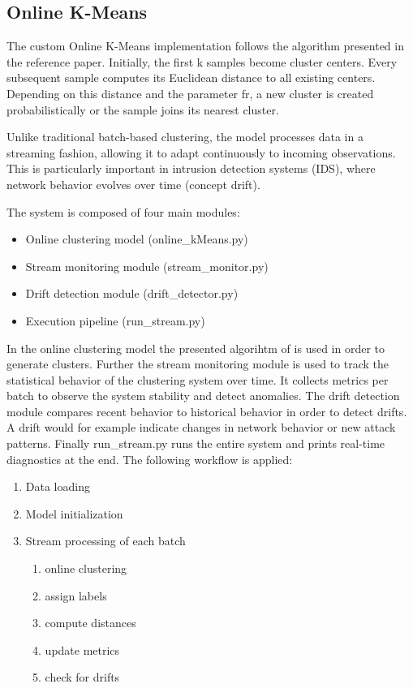 \subsection{Online K-Means}
The custom Online K-Means implementation follows the algorithm presented in the reference paper. Initially, the first k samples become cluster centers. Every subsequent sample computes its Euclidean distance to all existing centers. Depending on this distance and the parameter fr, a new cluster is created probabilistically or the sample joins its nearest cluster.

\nextparagraph
Unlike traditional batch-based clustering, the model processes data in a streaming fashion, allowing it to adapt continuously to incoming observations. This is particularly important in intrusion detection systems (IDS), where network behavior evolves over time (concept drift).

\nextparagraph
The system is composed of four main modules:
\begin{itemize}
    \item Online clustering model (online\_kMeans.py)
    \item Stream monitoring module (stream\_monitor.py)
    \item Drift detection module (drift\_detector.py)
    \item Execution pipeline (run\_stream.py)
\end{itemize}

\nextparagraph
In the online clustering model the presented algorihtm of \cite{kMeans} is used in order to generate clusters. Further the stream monitoring module is used to track the statistical behavior of the clustering system over time. It collects metrics per batch to observe the system stability and detect anomalies. The drift detection module compares recent behavior to historical behavior in order to detect drifts. A drift would for example indicate changes in network behavior or new attack patterns. Finally run\_stream.py runs the entire system and prints real-time diagnostics at the end. The following workflow is applied:
\begin{enumerate}
    \item Data loading
    \item Model initialization
    \item Stream processing of each batch
    \begin{enumerate}
        \item online clustering
        \item assign labels
        \item compute distances
        \item update metrics
        \item check for drifts
    \end{enumerate}
\end{enumerate}

